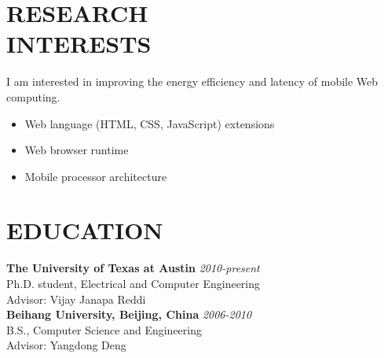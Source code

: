 \documentclass[margin, 9pt]{res} %
\begin{document}
\begin{resume}


\vspace*{-5pt}
\section{RESEARCH\\ INTERESTS} 

I am interested in improving the energy efficiency and latency of mobile Web computing.
 
\begin{itemize}[noitemsep, leftmargin=*]
	\item Web language (HTML, CSS, JavaScript) extensions
	\item Web browser runtime
	\item Mobile processor architecture
\end{itemize} 



\section{EDUCATION}

\textbf{The University of Texas at Austin} \hfill\textit{2010-present}\\
Ph.D. student, Electrical and Computer Engineering\\
Advisor: Vijay Janapa Reddi\\

\vspace*{-5pt}
\textbf{Beihang University, Beijing, China} \hfill\textit{2006-2010}\\
B.S., Computer Science and Engineering\\
Advisor: Yangdong Deng


\end{resume}
\end{document}
